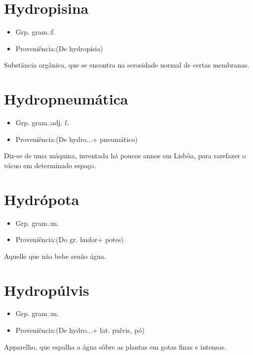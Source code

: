 \documentclass{article}
\begin{document}
\section{Hydropisina}
\begin{itemize}
\item {Grp. gram.:f.}
\end{itemize}
\begin{itemize}
\item {Proveniência:(De \textunderscore hydropisia\textunderscore )}
\end{itemize}
Substância orgânica, que se encontra na serosidade normal de certas membranas.
\section{Hydropneumática}
\begin{itemize}
\item {Grp. gram.:adj. f.}
\end{itemize}
\begin{itemize}
\item {Proveniência:(De \textunderscore hydro...\textunderscore  + \textunderscore pneumático\textunderscore )}
\end{itemize}
Diz-se de uma máquina, inventada há poucos annos em Lisbôa, para rarefazer o vácuo em determinado espaço.
\section{Hydrópota}
\begin{itemize}
\item {Grp. gram.:m.}
\end{itemize}
\begin{itemize}
\item {Proveniência:(Do gr. \textunderscore hudor\textunderscore  + \textunderscore potes\textunderscore )}
\end{itemize}
Aquelle que não bebe senão água.
\section{Hydropúlvis}
\begin{itemize}
\item {Grp. gram.:m.}
\end{itemize}
\begin{itemize}
\item {Proveniência:(De \textunderscore hydro...\textunderscore  + lat. \textunderscore pulvis\textunderscore , pó)}
\end{itemize}
Apparelho, que espalha a água sôbre as plantas em gotas finas e intensas.
\end{document}
